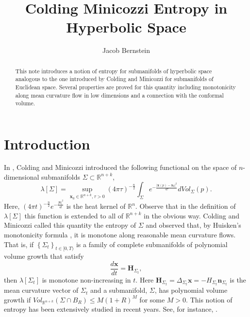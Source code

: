 \documentclass{amsart}
\title{Colding Minicozzi Entropy in Hyperbolic Space}
\author{Jacob Bernstein}
\theoremstyle{definition}
\theoremstyle{remark}
\numberwithin{equation}{section}
\newcommand{\set}[1]{\left\{#1\right\}}
\newcommand{\Real}{\mathbb R}
\begin{document}
\begin{abstract}
	This note introduces a notion of entropy for submanifolds of hyperbolic space analogous to the one introduced by Colding and Minicozzi for submanifolds of Euclidean space. Several properties are proved for this quantity including monotonicity along mean curvature flow in low dimensions and a connection with the conformal volume.
\end{abstract}
\maketitle
\section{Introduction}
In \cite{Coldinga}, Colding and Minicozzi introduced the following functional on the space of $n$-dimensional submanifolds $\Sigma\subset \Real^{n+k}$,
$$
\lambda[\Sigma]=\sup_{\mathbf{x}_0\in \Real^{n+k}, \tau>0} (4\pi \tau)^{-\frac{n}{2}}\int_{\Sigma} {e^{-\frac{|\mathbf{x}(p)-\mathbf{x}_0|^2}{4\tau}}} dVol_{\Sigma}(p).
$$
Here, $(4\pi t)^{-\frac{n}{2}} {e^{-\frac{|\mathbf{x}|^2}{4t}}}$ is the heat kernel of $\Real^n$.  Observe that in the definition of $\lambda[\Sigma]$ this function is extended to all of $\Real^{n+k}$ in the obvious way.
Colding and Minicozzi called this quantity the entropy of $\Sigma$ and observed that, by Huisken's monotonicity formula \cite{HuiskenMon}, it is monotone along reasonable mean curvature flows.  That is, if $\set{\Sigma_t}_{t\in [0,T)}$ is a family of complete submanifolds of polynomial volume growth that satisfy
$$
\frac{d\mathbf{x}}{dt}=\mathbf{H}_{\Sigma_t},
$$
then $\lambda[\Sigma_t]$ is monotone non-increasing in $t$.  Here $\mathbf{H}_{\Sigma_t}=\Delta_{\Sigma_t} \mathbf{x}=-H_{\Sigma_t} \mathbf{n}_{\Sigma_t}$ is the mean curvature vector of $\Sigma_t$ and a submanifold, $\Sigma$, has polynomial volume growth if $Vol_{\Real^{n+k}}(\Sigma\cap B_R)\leq M (1+R)^M$ for some $M>0$.  This notion of entropy has been extensively studied in recent years.  See, for instance, \cite{BWIsotopy, BernsteinWang1, JZhu, CIMW, BernsteinWang2, BernsteinWang3, BWHausdorff, SWang, KetoverZhou}.
\end{document}
